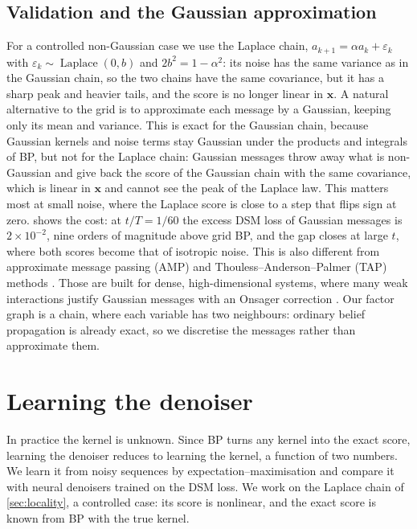 \documentclass{article}
\begin{document}
\subsection{Validation and the Gaussian approximation}
For a controlled non-Gaussian case we use the Laplace chain, $a_{k+1}=\alpha a_k+\varepsilon_k$ with
$\varepsilon_k\sim\operatorname{Laplace}(0,b)$ and $2b^2=1-\alpha^2$: its noise has the same variance as in the Gaussian
chain, so the two chains have the same covariance, but it has a sharp peak and heavier tails, and the score is no longer
linear in $\mathbf x$.
A natural alternative to the grid is to approximate each message by a Gaussian, keeping only its mean and variance. This
is exact for the Gaussian chain, because Gaussian kernels and noise terms stay Gaussian under the products and integrals
of BP, but not for the Laplace chain: Gaussian messages throw away what is non-Gaussian and give back the score of the
Gaussian chain with the same covariance, which is linear in $\mathbf x$ and cannot see the peak of the Laplace law. This
matters most at small noise, where the Laplace score is close to a step that flips sign at zero.
 shows the cost: at $t/T=1/60$ the excess DSM loss of Gaussian messages is $2\times10^{-2}$, nine
orders of magnitude above grid BP, and the gap closes at large $t$, where both scores become that of isotropic noise.
This is also different from approximate message passing (AMP) and Thouless--Anderson--Palmer (TAP) methods
\cite{thouless1977solution,mezard1986sk,mezard1987spin,kabashima2003cdma,donoho2009message,krzakala2012statistical,bolthausen2014iterative}.
Those are built for dense, high-dimensional systems, where many weak interactions justify Gaussian messages with an
Onsager correction \cite{zdeborova2016statistical,mezard2017meanfield,lauditi2023sparse}. Our factor graph is a chain,
where each variable has two neighbours: ordinary belief propagation is already exact, so we discretise the messages
rather than approximate them.

\section{Learning the denoiser}
\label{sec:learning}
\label{sec:laplace}

In practice the kernel is unknown. Since BP turns any kernel into the exact score, learning the denoiser reduces to
learning the kernel, a function of two numbers. We learn it from noisy sequences by expectation--maximisation and
compare it with neural denoisers trained on the DSM loss. We work on the Laplace chain of \cref{sec:locality}, a
controlled case: its score is nonlinear, and the exact score is known from BP with the true kernel.
\end{document}
